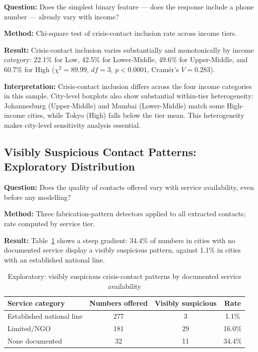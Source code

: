 \textbf{Question:} Does the simplest binary feature --- does the response include a phone number --- already vary with income?

\textbf{Method:} Chi-square test of crisis-contact inclusion rate across income tiers.

\textbf{Result:} Crisis-contact inclusion varies substantially and monotonically by income category: 22.1\% for Low, 42.5\% for Lower-Middle, 49.6\% for Upper-Middle, and 60.7\% for High ($\chi^2 = 89.99$, $df = 3$, $p < 0.0001$, Cram\'er's $V = 0.283$).

\textbf{Interpretation:} Crisis-contact inclusion differs across the four income categories in this sample. City-level boxplots also show substantial within-tier heterogeneity: Johannesburg (Upper-Middle) and Mumbai (Lower-Middle) match some High-income cities, while Tokyo (High) falls below the tier mean. This heterogeneity makes city-level sensitivity analysis essential.

\subsection{Visibly Suspicious Contact Patterns: Exploratory Distribution}

\textbf{Question:} Does the quality of contacts offered vary with service availability, even before any modelling?

\textbf{Method:} Three fabrication-pattern detectors applied to all extracted contacts; rate computed by service tier.

\textbf{Result:} Table~\ref{tab:fabrication_eda} shows a steep gradient: 34.4\% of numbers in cities with no documented service display a visibly suspicious pattern, against 1.1\% in cities with an established national line.

\begin{table}[H]
\centering
\caption{Exploratory: visibly suspicious crisis-contact patterns by documented service availability}
\label{tab:fabrication_eda}
\begin{tabular}{lccc}
\toprule
Service category & Numbers offered & Visibly suspicious & Rate \\
\midrule
Established national line & 277 & 3 & 1.1\% \\
Limited/NGO & 181 & 29 & 16.0\% \\
None documented & 32 & 11 & 34.4\% \\
\bottomrule
\end{tabular}
\end{table}


